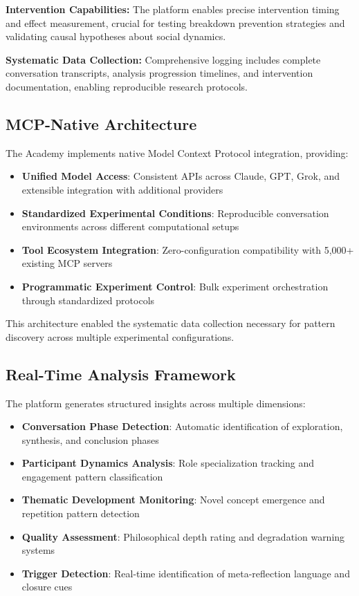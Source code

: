 \documentclass[11pt,letterpaper]{article}
\newcommand{\theacademy}{The Academy}
\begin{document}
\textbf{Intervention Capabilities:} The platform enables precise intervention timing and effect measurement, crucial for testing breakdown prevention strategies and validating causal hypotheses about social dynamics.

\textbf{Systematic Data Collection:} Comprehensive logging includes complete conversation transcripts, analysis progression timelines, and intervention documentation, enabling reproducible research protocols.

\subsection{MCP-Native Architecture}

\theacademy{} implements native Model Context Protocol integration, providing:

\begin{itemize}
    \item \textbf{Unified Model Access}: Consistent APIs across Claude, GPT, Grok, and extensible integration with additional providers
    \item \textbf{Standardized Experimental Conditions}: Reproducible conversation environments across different computational setups
    \item \textbf{Tool Ecosystem Integration}: Zero-configuration compatibility with 5,000+ existing MCP servers
    \item \textbf{Programmatic Experiment Control}: Bulk experiment orchestration through standardized protocols
\end{itemize}

This architecture enabled the systematic data collection necessary for pattern discovery across multiple experimental configurations.

\subsection{Real-Time Analysis Framework}

The platform generates structured insights across multiple dimensions:

\begin{itemize}
    \item \textbf{Conversation Phase Detection}: Automatic identification of exploration, synthesis, and conclusion phases
    \item \textbf{Participant Dynamics Analysis}: Role specialization tracking and engagement pattern classification
    \item \textbf{Thematic Development Monitoring}: Novel concept emergence and repetition pattern detection
    \item \textbf{Quality Assessment}: Philosophical depth rating and degradation warning systems
    \item \textbf{Trigger Detection}: Real-time identification of meta-reflection language and closure cues
\end{itemize}
\end{document}
